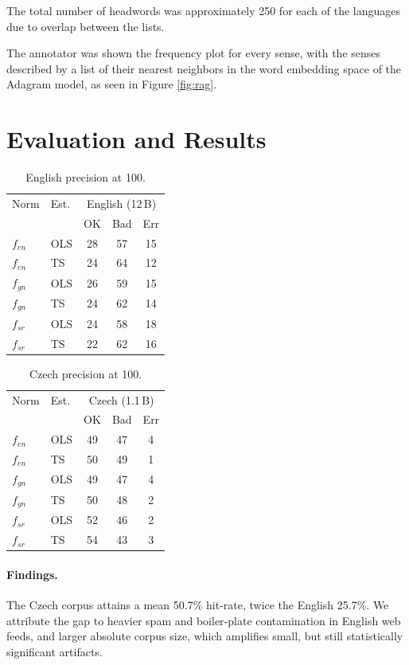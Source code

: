 \documentclass[11pt]{article}
\begin{document}
The total number of headwords was approximately 250 for each of the languages due to overlap between the lists.

The annotator was shown the frequency plot for every sense, with the senses described by a list of their nearest neighbors in the word embedding space of the Adagram model, as seen in Figure \ref{fig:rag}.

\section{Evaluation and Results}
\label{sec:results}


\begin{table}[h!]
\centering\small
\begin{tabular}{llccc}
\toprule
Norm & Est. & \multicolumn{3}{c}{English (12\,B)} \\
     &      & OK & Bad & Err \\
\midrule
$f_{en}$ & OLS & 28 & 57 & 15 \\
$f_{en}$ & TS  & 24 & 64 & 12 \\
$f_{gn}$ & OLS & 26 & 59 & 15 \\
$f_{gn}$ & TS  & 24 & 62 & 14 \\
$f_{sr}$ & OLS & 24 & 58 & 18 \\
$f_{sr}$ & TS  & 22 & 62 & 16 \\
\bottomrule
\end{tabular}
\caption{English precision at 100.}
\label{tab:en}
\end{table}

\begin{table}[h!]
\centering\small
\begin{tabular}{llccc}
\toprule
Norm & Est. & \multicolumn{3}{c}{Czech (1.1\,B)} \\
     &      & OK & Bad & Err \\
\midrule
$f_{en}$ & OLS & 49 & 47 & 4 \\
$f_{en}$ & TS  & 50 & 49 & 1 \\
$f_{gn}$ & OLS & 49 & 47 & 4 \\
$f_{gn}$ & TS  & 50 & 48 & 2 \\
$f_{sr}$ & OLS & 52 & 46 & 2 \\
$f_{sr}$ & TS  & 54 & 43 & 3 \\
\bottomrule
\end{tabular}
\caption{Czech precision at 100.}
\label{tab:cs}
\end{table}

\paragraph{Findings.}
The Czech corpus attains a mean 50.7\% hit‑rate,
twice the English 25.7\%.  We attribute the gap to heavier spam and boiler‑plate contamination in English web feeds, and larger absolute corpus size, which amplifies small, but still statistically significant artifacts.
\end{document}

